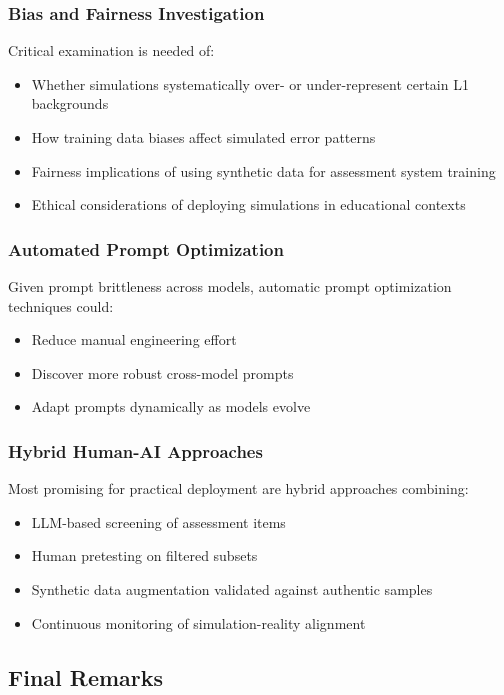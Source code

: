 \subsubsection{Bias and Fairness Investigation}

Critical examination is needed of:
\begin{itemize}
    \item Whether simulations systematically over- or under-represent certain L1 backgrounds
    \item How training data biases affect simulated error patterns
    \item Fairness implications of using synthetic data for assessment system training
    \item Ethical considerations of deploying simulations in educational contexts
\end{itemize}

\subsubsection{Automated Prompt Optimization}

Given prompt brittleness across models, automatic prompt optimization techniques \cite{zhou2023large} could:
\begin{itemize}
    \item Reduce manual engineering effort
    \item Discover more robust cross-model prompts
    \item Adapt prompts dynamically as models evolve
\end{itemize}

\subsubsection{Hybrid Human-AI Approaches}

Most promising for practical deployment are hybrid approaches combining:
\begin{itemize}
    \item LLM-based screening of assessment items
    \item Human pretesting on filtered subsets
    \item Synthetic data augmentation validated against authentic samples
    \item Continuous monitoring of simulation-reality alignment
\end{itemize}

\subsection{Final Remarks}

